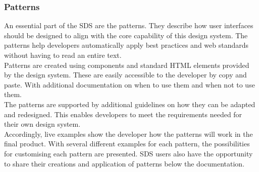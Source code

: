 \subsubsection{Patterns}
An essential part of the \ac{SDS} are the patterns. They describe how user interfaces should be designed to align with the core capability of this design system. The patterns help developers automatically apply best practices and web standards without having to read an entire text. \\
Patterns are created using components and standard HTML elements provided by the design system. These are easily accessible to the developer by copy and paste. With additional documentation on when to use them and when not to use them. \\
The patterns are supported by additional guidelines on how they can be adapted and redesigned. This enables developers to meet the requirements needed for their own design system.\\
Accordingly, live examples show the developer how the patterns will work in the final product. With several different examples for each pattern, the possibilities for customising each pattern are presented. \ac{SDS} users also have the opportunity to share their creations and application of patterns below the documentation. 
